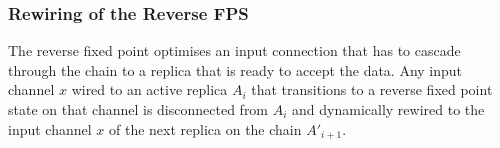     \subsubsection{Rewiring of the Reverse FPS}
The reverse fixed point optimises an input connection that has to cascade through the chain to a replica that is ready to accept the data. Any input channel $x$ wired to an active replica $A_i$ that transitions to a reverse fixed point state on that channel is disconnected from $A_i$ and dynamically rewired to the input channel $x$ of the next replica on the chain $A'_{i+1}$.




%
%
%
%
%
%
